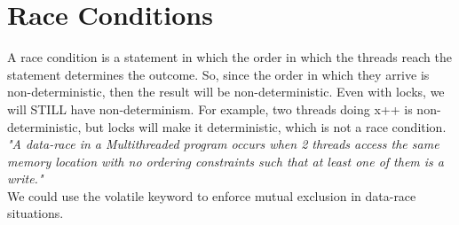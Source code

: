 \documentclass[12pt]{article}
\theoremstyle{definition}
\begin{document}
\section{Race Conditions}
A race condition is a statement in which the order in which the threads reach the statement determines the outcome. So, since the order in which they arrive is non-deterministic, then the result will be non-deterministic. Even with locks, we will STILL have non-determinism. For example, two threads doing x++ is non-deterministic, but locks will make it deterministic, which is not a race condition. 
\\ \linebreak
\textit{"A data-race in a Multithreaded program occurs when 2 threads access the same memory location with no ordering constraints such that at least one of them is a write."} 
\\ \linebreak
We could use the volatile keyword to enforce mutual exclusion in data-race situations.
\end{document}
